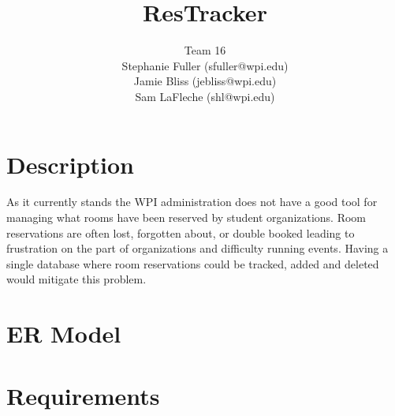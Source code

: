 \documentclass{article}
\title{ResTracker}
\author{Team 16\\Stephanie Fuller (sfuller@wpi.edu)\\Jamie Bliss (jebliss@wpi.edu)\\Sam
LaFleche (shl@wpi.edu)}
\begin{document}
\maketitle

\section{Description}
As it currently stands the WPI administration does not have a good tool for
managing what rooms have been reserved by student organizations. Room
reservations are often lost, forgotten about, or double booked leading to
frustration on the part of organizations and difficulty running events. Having a
single database where room reservations could be tracked, added and deleted
would mitigate this problem.

\section{ER Model}

\section{Requirements}
\end{document}
